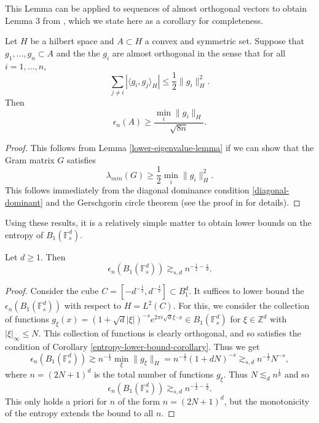 This Lemma can be applied to sequences of almost orthogonal vectors to obtain Lemma 3 from \cite{makovoz1996random}, which we state here as a corollary for completeness.
\begin{corollary}\label{entropy-lower-bound-corollary}
 Let $H$ be a hilbert space and $A\subset H$ a convex and symmetric set. Suppose that $g_1,...,g_n\subset A$ and the the $g_i$ are almost orthogonal in the sense that for all $i = 1,...,n$,
 \begin{equation}\label{diagonal-dominant}
  \sum_{j\neq i}|\langle g_i,g_j\rangle_H| \leq \frac{1}{2}\|g_i\|_H^2.
 \end{equation}
 Then
 \begin{equation}
  \epsilon_{n}(A)\geq \frac{\min_i \|g_i\|_H}{\sqrt{8n}}.
 \end{equation}
\end{corollary}
\begin{proof}
 This follows from Lemma \ref{lower-eigenvalue-lemma} if we can show that the Gram matrix $G$ satisfies
 \begin{equation}
  \lambda_{min}(G) \geq \frac{1}{2}\min_i \|g_i\|^2_H.
 \end{equation}
 This follows immediately from the diagonal dominance condition \ref{diagonal-dominant} and the Gerschgorin circle theorem (see the proof in \cite{makovoz1996random} for details).
\end{proof}

Using these results, it is a relatively simple matter to obtain lower bounds on the entropy of $B_1(\mathbb{F}_s^d)$.
\begin{proposition}
 Let $d \geq 1$. Then
 \begin{equation}
  \epsilon_n(B_1(\mathbb{F}_s^d)) \gtrsim_{s,d} n^{-\frac{1}{2}-\frac{s}{d}}.
 \end{equation}
\end{proposition}
\begin{proof}
 Consider the cube $C = [-d^{-\frac{1}{2}},d^{-\frac{1}{2}}]\subset B_1^d$. It suffices to lower bound the $\epsilon_n(B_1(\mathbb{F}_s^d))$ with respect to $H = L^2(C)$. For this, we consider the collection of functions $g_\xi(x) = (1 + \sqrt{d}|\xi|)^{-s}e^{2\pi i \sqrt{d}\xi \cdot x}\in B_1(\mathbb{F}_s^d)$ for $\xi\in \mathbb{Z}^d$ with $|\xi|_\infty \leq N$. This collection of functions is clearly orthogonal, and so satisfies the condition of Corollary \ref{entropy-lower-bound-corollary}. Thus we get
 \begin{equation}
  \epsilon_n(B_1(\mathbb{F}_s^d)) \gtrsim n^{-\frac{1}{2}}\min_{\xi}\|g_{\xi}\|_H = n^{-\frac{1}{2}}(1+dN)^{-s} \gtrsim_{s,d} n^{-\frac{1}{2}}N^{-s},
 \end{equation}
 where $n = (2N+1)^d$ is the total number of functions $g_\xi$. Thus $N \lesssim_d n^{\frac{1}{d}}$ and so
 \begin{equation}
  \epsilon_n(B_1(\mathbb{F}_s^d))\gtrsim_{s,d} n^{-\frac{1}{2}-\frac{s}{d}}.
 \end{equation}
 This only holds a priori for $n$ of the form $n = (2N+1)^d$, but the monotonicity of the entropy extends the bound to all $n$.
\end{proof}

